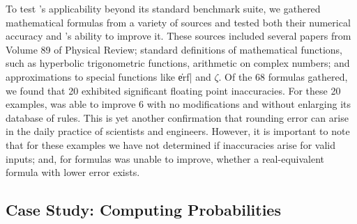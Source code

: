 \documentclass[paper.tex]{subfiles}
\begin{document}
To test \casio's applicability beyond its standard benchmark suite,
  we gathered mathematical formulas from a variety of sources
  and tested both their numerical accuracy
  and \casio's ability to improve it.
These sources included several papers from Volume 89 of Physical Review;
  standard definitions of mathematical functions,
  such as hyperbolic trigonometric functions,
  arithmetic on complex numbers;
  and approximations to special functions like \|erf| and $\zeta$.
Of the 68 formulas gathered, we found that
  20 exhibited significant floating point inaccuracies.
For these 20 examples, \casio was able to improve 6
  with no modifications and without enlarging its database of rules.
This is yet another confirmation
  that rounding error can arise in the daily practice of scientists and engineers.
However, it is important to note that for these examples
  we have not determined if inaccuracies arise for valid inputs;
  and, for formulas \casio was unable to improve,
  whether a real-equivalent formula with lower error exists.

\subsection{Case Study: Computing Probabilities}

\end{document}
